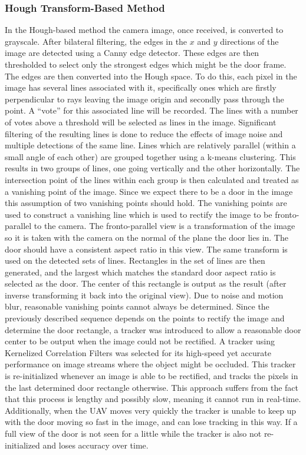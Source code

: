 \documentclass[12pt]{article}
\begin{document}
\subsubsection{Hough Transform-Based Method}
In the Hough-based method the camera image, once received, is converted to grayscale. After bilateral filtering, the edges in the $x$ and $y$ directions of the image are detected using a Canny edge detector. These edges are then thresholded to select only the strongest edges which might be the door frame. The edges are then converted into the Hough space. To do this, each pixel in the image has several lines associated with it, specifically ones which are firstly perpendicular to rays leaving the image origin and secondly pass through the point. A ``vote'' for this associated line will be recorded. The lines with a number of votes above a threshold will be selected as lines in the image. Significant filtering of the resulting lines is done to reduce the effects of image noise and multiple detections of the same line. Lines which are relatively parallel (within a small angle of each other) are grouped together using a k-means clustering. This results in two groups of lines, one going vertically and the other horizontally. The intersection point of the lines within each group is then calculated and treated as a vanishing point of the image. Since we expect there to be a door in the image this assumption of two vanishing points should hold. The vanishing points are used to construct a vanishing line which is used to rectify the image to be fronto-parallel to the camera. The fronto-parallel view is a transformation of the image so it is taken with the camera on the normal of the plane the door lies in. The door should have a consistent aspect ratio in this view. The same transform is used on the detected sets of lines. Rectangles in the set of lines are then generated, and the largest which matches the standard door aspect ratio is selected as the door. The center of this rectangle is output as the result (after inverse transforming it back into the original view). Due to noise and motion blur, reasonable vanishing points cannot always be determined. Since the previously described sequence depends on the points to rectify the image and determine the door rectangle, a tracker was introduced to allow a reasonable door center to be output when the image could not be rectified. A tracker using Kernelized Correlation Filters \cite{KCF} was selected for its high-speed yet accurate performance on image streams where the object might be occluded. This tracker is re-initialized whenever an image is able to be rectified, and tracks the pixels in the last determined door rectangle otherwise. This approach suffers from the fact that this process is lengthy and possibly slow, meaning it cannot run in real-time. Additionally, when the UAV moves very quickly the tracker is unable to keep up with the door moving so fast in the image, and can lose tracking in this way. If a full view of the door is not seen for a little while the tracker is also not re-initialized and loses accuracy over time. 
\end{document}
